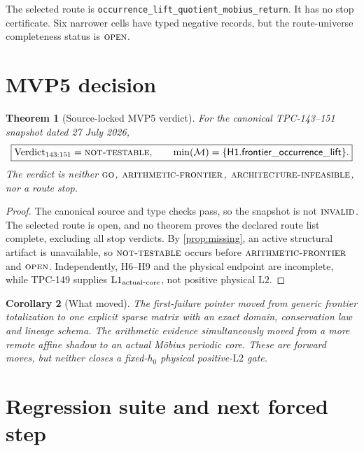 \documentclass[11pt]{article}
\newtheorem{theorem}{Theorem}[section]
\newtheorem{corollary}[theorem]{Corollary}
\theoremstyle{definition}
\theoremstyle{remark}
\newcommand{\Lone}{\mathrm{L1}}
\newcommand{\Ltwo}{\mathrm{L2}}
\newcommand{\GO}{\textnormal{\textsc{go}}}
\newcommand{\AINF}{\textnormal{\textsc{architecture-infeasible}}}
\newcommand{\NT}{\textnormal{\textsc{not-testable}}}
\newcommand{\AF}{\textnormal{\textsc{arithmetic-frontier}}}
\newcommand{\OPEN}{\textnormal{\textsc{open}}}
\newcommand{\INVALID}{\textnormal{\textsc{invalid}}}
\begin{document}
The selected route is
\nolinkurl{occurrence_lift_quotient_mobius_return}.  It has no stop
certificate.  Six narrower cells have typed negative records, but the
route-universe completeness status is \(\OPEN\).

\section{MVP5 decision}

\begin{theorem}[Source-locked MVP5 verdict]
\label{thm:decision}
For the canonical TPC-143--151 snapshot dated 27 July 2026,
\[
 \boxed{
 \operatorname{Verdict}_{143:151}=\NT,
 \qquad
 \min(\mathcal M)=
 \{\mathsf{H1.frontier\_occurrence\_lift}\}.}
\]
The verdict is neither \(\GO\), \(\AF\), \(\AINF\), nor a route stop.
\end{theorem}

\begin{proof}
The canonical source and type checks pass, so the snapshot is not
\(\INVALID\).  The selected route is open, and no theorem proves the
declared route list complete, excluding all stop verdicts.  By
\cref{prop:missing}, an active structural artifact is unavailable, so
\(\NT\) occurs before \(\AF\) and \(\OPEN\).  Independently, H6--H9
and the physical endpoint are incomplete, while TPC-149 supplies
\(\Lone_{\rm actual\mbox{-}core}\), not positive physical \(\Ltwo\).
\end{proof}

\begin{corollary}[What moved]
The first-failure pointer moved from generic frontier totalization to
one explicit sparse matrix with an exact domain, conservation law and
lineage schema.  The arithmetic evidence simultaneously moved from a
more remote affine shadow to an actual M\"obius periodic core.  These
are forward moves, but neither closes a fixed-\(h_0\) physical
positive-\(\Ltwo\) gate.
\end{corollary}

\section{Regression suite and next forced step}
\end{document}
